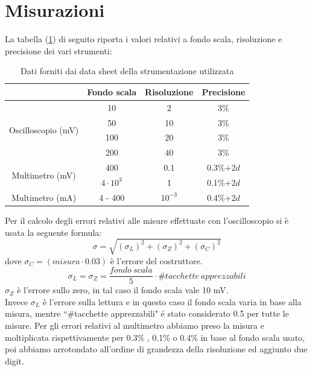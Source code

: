 \documentclass[]{article}
\begin{document}
\section{Misurazioni}
La tabella (\ref{tab:strumenti}) di seguito riporta i valori relativi a fondo scala, risoluzione e precisione dei vari strumenti:
	\begin{table}[H]
		\centering
		\begin{tabular}{|c|c|c|c|}
			\cline{2-4}
			\multicolumn{1}{c|}{} & Fondo scala & Risoluzione & Precisione \\
			\hline
			\multirow{4}{*}{Oscilloscopio (mV)} & 10 & 2 & 3\% \\
			\cline{2-4}
			& 50 & 10 & 3\% \\
			\cline{2-4}
			& 100 & 20 & 3\% \\
			\cline{2-4}
			& 200 & 40 & 3\% \\
			\hline
			\multirow{2}{*}{Multimetro (mV)} & 400 & 0.1 & 0.3\%$+2d$ \\
			\cline{2-4}
			&$4\cdot10^3$ & 1 & 0.1\%$+2d$\\
			\hline
			Multimetro (mA) & 4 - 400 & $10^{-3}$ & 0.4\%$+2d$ \\
			\hline
		\end{tabular}
	\label{tab:strumenti}
	\caption{Dati forniti dai data sheet della strumentazione utilizzata}
	\end{table}
Per il calcolo degli errori relativi alle misure effettuate con l'oscilloscopio si è usata la seguente formula:
\begin{equation}
	\sigma=\sqrt{(\sigma_{L})^{2}+(\sigma_{Z})^{2}+(\sigma_{C})^{2}}
\end{equation}
dove $\sigma_{C}= (misura\cdot0.03) $ è l'errore del costruttore. 
\begin{equation*}
	\sigma_{L}=\sigma_{Z}=\frac{fondo \:scala}{5}\cdot\#tacchette \:apprezzabili
\end{equation*}
$ \sigma_{Z} $ è l'errore sullo zero, in tal caso il fondo scala vale 10 mV.\\
Invece $ \sigma_{L} $ è l'errore sulla lettura e in questo caso il fondo scala varia in base alla misura, mentre ``\#tacchette apprezzabili" é stato considerato 0.5 per tutte le misure.
Per gli errori relativi al multimetro abbiamo preso la misura e moltiplicata rispettivamente per 0.3\% , 0.1\% o 0.4\%  in base al fondo scala usato, poi abbiamo arrotondato all'ordine di grandezza della risoluzione ed aggiunto due digit.
\end{document}
